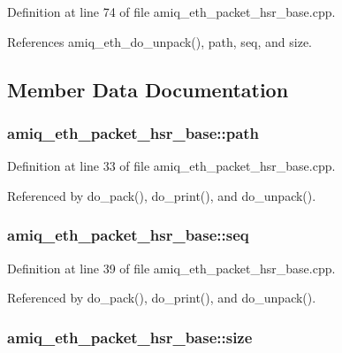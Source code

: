 Definition at line 74 of file amiq\_\-eth\_\-packet\_\-hsr\_\-base.cpp.

References amiq\_\-eth\_\-do\_\-unpack(), path, seq, and size.

\subsection{Member Data Documentation}
\hypertarget{classamiq__eth__packet__hsr__base_a27533834175513de14aaf23193acec8c}{
\subsubsection[{path}]{ {\bf amiq\_\-eth\_\-packet\_\-hsr\_\-base::path}}}
\label{classamiq__eth__packet__hsr__base_a27533834175513de14aaf23193acec8c}


Definition at line 33 of file amiq\_\-eth\_\-packet\_\-hsr\_\-base.cpp.

Referenced by do\_\-pack(), do\_\-print(), and do\_\-unpack().\hypertarget{classamiq__eth__packet__hsr__base_a15d40516f06a90dfaf7f977e6fa71a98}{
\subsubsection[{seq}]{ {\bf amiq\_\-eth\_\-packet\_\-hsr\_\-base::seq}}}
\label{classamiq__eth__packet__hsr__base_a15d40516f06a90dfaf7f977e6fa71a98}


Definition at line 39 of file amiq\_\-eth\_\-packet\_\-hsr\_\-base.cpp.

Referenced by do\_\-pack(), do\_\-print(), and do\_\-unpack().\hypertarget{classamiq__eth__packet__hsr__base_aeb5c412d0bf3e9fda200043e041b0cb9}{
\subsubsection[{size}]{ {\bf amiq\_\-eth\_\-packet\_\-hsr\_\-base::size}}}
\label{classamiq__eth__packet__hsr__base_aeb5c412d0bf3e9fda200043e041b0cb9}


